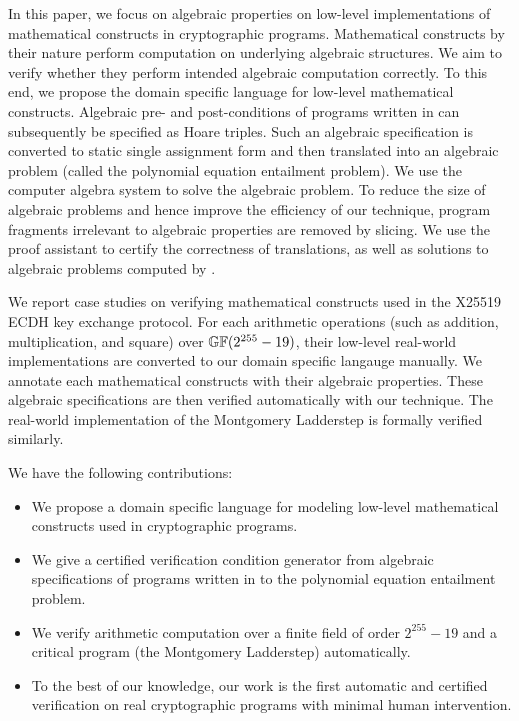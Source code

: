 In this paper, we focus on algebraic properties on low-level
implementations of mathematical constructs in cryptographic programs.
Mathematical constructs by their nature perform computation on
underlying algebraic structures. We aim to verify whether they perform
intended algebraic computation correctly. To this end, we propose the
domain specific language \mydsl for low-level 
mathematical constructs. Algebraic pre- and post-conditions of
programs written in \mydsl can subsequently be specified as Hoare
triples. Such an algebraic specification is converted to static single 
assignment form and then translated into an algebraic problem (called 
the polynomial equation entailment problem). We use the computer
algebra system \singular to solve the algebraic problem. To reduce the
size of algebraic problems and hence improve the efficiency of our
technique, program fragments irrelevant to algebraic properties are
removed by slicing. We use the proof assistant \coq to certify the
correctness of translations, as well as solutions to algebraic
problems computed by \singular.

We report case studies on verifying mathematical constructs used in
the X25519 ECDH key exchange protocol. For each arithmetic operations
(such as addition, multiplication, and square) over $\mathbb{GF}(2^{255} - 19)$,
their low-level real-world implementations are converted to our domain
specific langauge \mydsl manually. We annotate each mathematical
constructs with their algebraic properties. These algebraic
specifications are then verified automatically with our technique. 
The real-world implementation of the Montgomery Ladderstep is formally
verified similarly.  



We have the following contributions:
\begin{itemize}
\item We propose a domain specific language \mydsl for modeling low-level
  mathematical constructs used in cryptographic programs.
\item We give a certified verification condition generator from
  algebraic specifications of programs written in \mydsl to the polynomial
  equation entailment problem.
\item We verify arithmetic computation over a finite field of order
  $2^{255} - 19$ and a
  critical program (the Montgomery Ladderstep) automatically.
\item To the best of our knowledge, our work is the first automatic
  and certified verification on real cryptographic programs with
  minimal human intervention.
\end{itemize}

